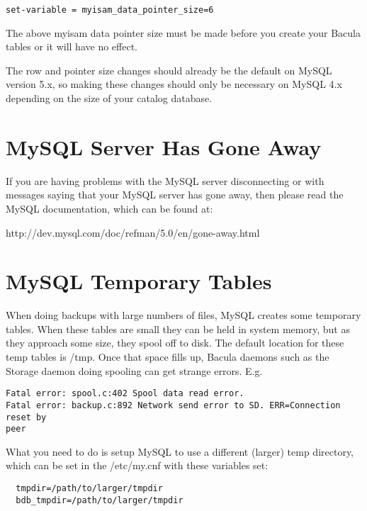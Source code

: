 \footnotesize                                 
\begin{verbatim}
set-variable = myisam_data_pointer_size=6
\end{verbatim}
\normalsize

The above myisam data pointer size must be made before you create your
Bacula tables or it will have no effect.

The row and pointer size changes should already be the default on MySQL
version 5.x, so making these changes should only be necessary on MySQL 4.x
depending on the size of your catalog database.

\section{MySQL Server Has Gone Away}
If you are having problems with the MySQL server disconnecting or with
messages saying that your MySQL server has gone away, then please read
the MySQL documentation, which can be found at:

{http://dev.mysql.com/doc/refman/5.0/en/gone-away.html}

\section{MySQL Temporary Tables}
When doing backups with large numbers of files, MySQL creates some
temporary tables.  When these tables are small they can be held in
system memory, but as they approach some size, they
spool off to disk.  The default location for these temp tables is
/tmp.  Once that space fills up, Bacula daemons such as the Storage
daemon doing spooling can get strange errors. E.g.

\footnotesize                                 
\begin{verbatim}
Fatal error: spool.c:402 Spool data read error.
Fatal error: backup.c:892 Network send error to SD. ERR=Connection reset by
peer
\end{verbatim}
\normalsize

What you need to do is setup MySQL to use a different (larger) temp
directory, which can be set in the /etc/my.cnf with these variables
set:

\footnotesize                                 
\begin{verbatim}
  tmpdir=/path/to/larger/tmpdir
  bdb_tmpdir=/path/to/larger/tmpdir
\end{verbatim}
\normalsize

